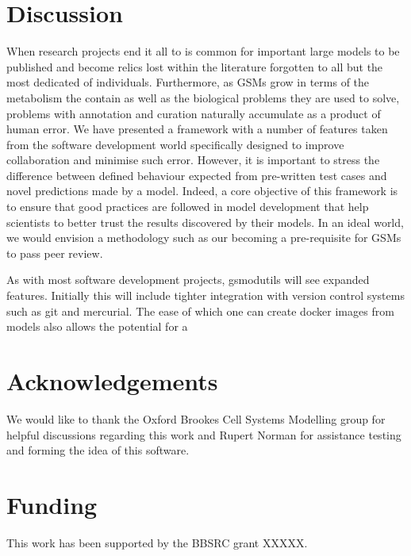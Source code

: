 \documentclass{bioinfo}
\begin{document}
\section{Discussion}
When research projects end it all to is common for important large models to be published and become relics lost within the literature forgotten to all but the most dedicated of individuals.
Furthermore, as GSMs grow in terms of the metabolism the contain as well as the biological problems they are used to solve, problems with annotation and curation naturally accumulate as a product of human error.
We have presented a framework with a number of features taken from the software development world specifically designed to improve collaboration and minimise such error.
However, it is important to stress the difference between defined behaviour expected from pre-written test cases and novel predictions made by a model.
Indeed, a core objective of this framework is to ensure that good practices are followed in model development that help scientists to better trust the results discovered by their models.
In an ideal world, we would envision a methodology such as our becoming a pre-requisite for GSMs to pass peer review. 

As with most software development projects, gsmodutils will see expanded features.
Initially this will include tighter integration with version control systems such as git and mercurial.
The ease of which one can create docker images from models also allows the potential for a 

\section*{Acknowledgements}
We would like to thank the Oxford Brookes Cell Systems Modelling group for helpful discussions regarding this work and Rupert Norman for assistance testing and forming the idea of this software.

\section*{Funding}
This work has been supported by the BBSRC grant XXXXX.




\end{document}

